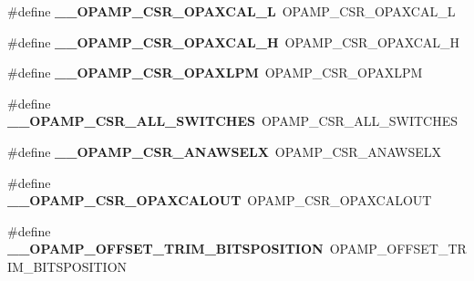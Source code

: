 \begin{DoxyCompactItemize}
\item 
\#define {\bfseries \+\_\+\+\_\+\+O\+P\+A\+M\+P\+\_\+\+C\+S\+R\+\_\+\+O\+P\+A\+X\+C\+A\+L\+\_\+L}~O\+P\+A\+M\+P\+\_\+\+C\+S\+R\+\_\+\+O\+P\+A\+X\+C\+A\+L\+\_\+L\hypertarget{group___h_a_l___o_p_a_m_p___aliased___macros_ga476dfa7349959c398e971c4e96e656ad}{}\label{group___h_a_l___o_p_a_m_p___aliased___macros_ga476dfa7349959c398e971c4e96e656ad}

\item 
\#define {\bfseries \+\_\+\+\_\+\+O\+P\+A\+M\+P\+\_\+\+C\+S\+R\+\_\+\+O\+P\+A\+X\+C\+A\+L\+\_\+H}~O\+P\+A\+M\+P\+\_\+\+C\+S\+R\+\_\+\+O\+P\+A\+X\+C\+A\+L\+\_\+H\hypertarget{group___h_a_l___o_p_a_m_p___aliased___macros_ga0fec50091b520af8698fddad86932f0d}{}\label{group___h_a_l___o_p_a_m_p___aliased___macros_ga0fec50091b520af8698fddad86932f0d}

\item 
\#define {\bfseries \+\_\+\+\_\+\+O\+P\+A\+M\+P\+\_\+\+C\+S\+R\+\_\+\+O\+P\+A\+X\+L\+PM}~O\+P\+A\+M\+P\+\_\+\+C\+S\+R\+\_\+\+O\+P\+A\+X\+L\+PM\hypertarget{group___h_a_l___o_p_a_m_p___aliased___macros_gad32527d90ee52b1a01ca9d4708d49546}{}\label{group___h_a_l___o_p_a_m_p___aliased___macros_gad32527d90ee52b1a01ca9d4708d49546}

\item 
\#define {\bfseries \+\_\+\+\_\+\+O\+P\+A\+M\+P\+\_\+\+C\+S\+R\+\_\+\+A\+L\+L\+\_\+\+S\+W\+I\+T\+C\+H\+ES}~O\+P\+A\+M\+P\+\_\+\+C\+S\+R\+\_\+\+A\+L\+L\+\_\+\+S\+W\+I\+T\+C\+H\+ES\hypertarget{group___h_a_l___o_p_a_m_p___aliased___macros_ga8baa137838166f683fe84ba887fbaae2}{}\label{group___h_a_l___o_p_a_m_p___aliased___macros_ga8baa137838166f683fe84ba887fbaae2}

\item 
\#define {\bfseries \+\_\+\+\_\+\+O\+P\+A\+M\+P\+\_\+\+C\+S\+R\+\_\+\+A\+N\+A\+W\+S\+E\+LX}~O\+P\+A\+M\+P\+\_\+\+C\+S\+R\+\_\+\+A\+N\+A\+W\+S\+E\+LX\hypertarget{group___h_a_l___o_p_a_m_p___aliased___macros_ga7eabece68a39d88bbd36c17dda9da7dc}{}\label{group___h_a_l___o_p_a_m_p___aliased___macros_ga7eabece68a39d88bbd36c17dda9da7dc}

\item 
\#define {\bfseries \+\_\+\+\_\+\+O\+P\+A\+M\+P\+\_\+\+C\+S\+R\+\_\+\+O\+P\+A\+X\+C\+A\+L\+O\+UT}~O\+P\+A\+M\+P\+\_\+\+C\+S\+R\+\_\+\+O\+P\+A\+X\+C\+A\+L\+O\+UT\hypertarget{group___h_a_l___o_p_a_m_p___aliased___macros_ga07a3019c291d8ee540821dec9c5a2bd0}{}\label{group___h_a_l___o_p_a_m_p___aliased___macros_ga07a3019c291d8ee540821dec9c5a2bd0}

\item 
\#define {\bfseries \+\_\+\+\_\+\+O\+P\+A\+M\+P\+\_\+\+O\+F\+F\+S\+E\+T\+\_\+\+T\+R\+I\+M\+\_\+\+B\+I\+T\+S\+P\+O\+S\+I\+T\+I\+ON}~O\+P\+A\+M\+P\+\_\+\+O\+F\+F\+S\+E\+T\+\_\+\+T\+R\+I\+M\+\_\+\+B\+I\+T\+S\+P\+O\+S\+I\+T\+I\+ON\hypertarget{group___h_a_l___o_p_a_m_p___aliased___macros_ga45a1e3e121f1289a77b4f43b91d050aa}{}\label{group___h_a_l___o_p_a_m_p___aliased___macros_ga45a1e3e121f1289a77b4f43b91d050aa}


\end{DoxyCompactItemize}
